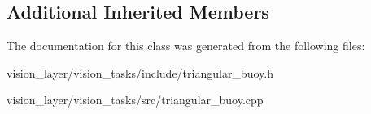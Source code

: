 \subsection*{Additional Inherited Members}


The documentation for this class was generated from the following files\+:\begin{DoxyCompactItemize}
\item 
vision\+\_\+layer/vision\+\_\+tasks/include/triangular\+\_\+buoy.\+h\item 
vision\+\_\+layer/vision\+\_\+tasks/src/triangular\+\_\+buoy.\+cpp\end{DoxyCompactItemize}
